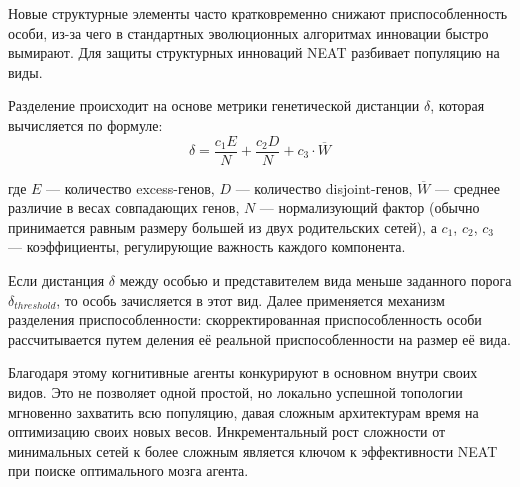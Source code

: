 Новые структурные элементы часто кратковременно снижают приспособленность особи, из-за чего в стандартных эволюционных алгоритмах инновации быстро вымирают. Для защиты структурных инноваций NEAT разбивает популяцию на виды.

Разделение происходит на основе метрики генетической дистанции $\delta$, которая вычисляется по формуле:
\begin{equation}
  \label{eq:genetic_distance}
  \delta = \frac{c_1 E}{N} + \frac{c_2 D}{N} + c_3 \cdot \overline{W}
\end{equation}

где $E$ — количество excess-генов, $D$ — количество disjoint-генов, $\overline{W}$ — среднее различие в весах совпадающих генов, $N$ — нормализующий фактор (обычно принимается равным размеру большей из двух родительских сетей), а $c_1$, $c_2$, $c_3$ — коэффициенты, регулирующие важность каждого компонента.

Если дистанция $\delta$ между особью и представителем вида меньше заданного порога $\delta_{threshold}$, то особь зачисляется в этот вид. Далее применяется механизм разделения приспособленности: скорректированная приспособленность особи рассчитывается путем деления её реальной приспособленности на размер её вида.

Благодаря этому когнитивные агенты конкурируют в основном внутри своих видов. Это не позволяет одной простой, но локально успешной топологии мгновенно захватить всю популяцию, давая сложным архитектурам время на оптимизацию своих новых весов. Инкрементальный рост сложности от минимальных сетей к более сложным является ключом к эффективности NEAT при поиске оптимального мозга агента.